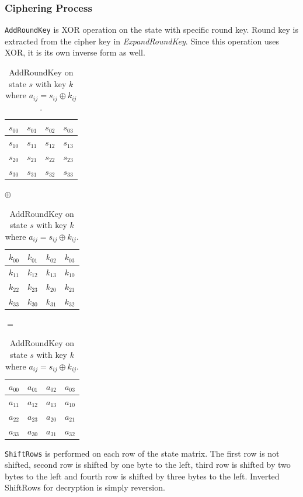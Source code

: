 \subsubsection*{Ciphering Process}
\texttt{AddRoundKey} is XOR operation on the state with specific round key. 
Round key is extracted from the cipher key in \textit{ExpandRoundKey}. Since
this operation uses XOR, it is its own inverse form as well.

\begin{table}[H]
\label{shift}
\begin{center}
\begin{tabular}{|c|c|c|c|}\hline%
 $s_{00}$ & $s_{01}$ & $s_{02}$ & $s_{03}$  \\\hline
 $s_{10}$ & $s_{11}$ & $s_{12}$ & $s_{13}$  \\\hline
 $s_{20}$ & $s_{21}$ & $s_{22}$ & $s_{23}$  \\\hline
 $s_{30}$ & $s_{31}$ & $s_{32}$ & $s_{33}$  \\\hline
\end{tabular}
$\oplus$
\begin{tabular}{|c|c|c|c|}\hline%
 $k_{00}$ & $k_{01}$ & $k_{02}$ & $k_{03}$  \\\hline
 $k_{11}$ & $k_{12}$ & $k_{13}$ & $k_{10}$  \\\hline
 $k_{22}$ & $k_{23}$ & $k_{20}$ & $k_{21}$  \\\hline
 $k_{33}$ & $k_{30}$ & $k_{31}$ & $k_{32}$  \\\hline
\end{tabular}
$=$
\begin{tabular}{|c|c|c|c|}\hline%
 $a_{00}$ & $a_{01}$ & $a_{02}$ & $a_{03}$  \\\hline
 $a_{11}$ & $a_{12}$ & $a_{13}$ & $a_{10}$  \\\hline
 $a_{22}$ & $a_{23}$ & $a_{20}$ & $a_{21}$  \\\hline
 $a_{33}$ & $a_{30}$ & $a_{31}$ & $a_{32}$  \\\hline
\end{tabular}
\end{center}
\caption{AddRoundKey on state $s$ with key $k$ where $a_{ij} = s_{ij}\oplus k_{ij}$.}
\end{table}



\hspace{-1.5em}\texttt{ShiftRows} is performed on each row of the state matrix.
The first row is not shifted, second row is shifted by one byte to the left, 
third row is shifted by two bytes to the left and fourth row is shifted by three
bytes to the left. Inverted ShiftRows for decryption is simply reversion.

